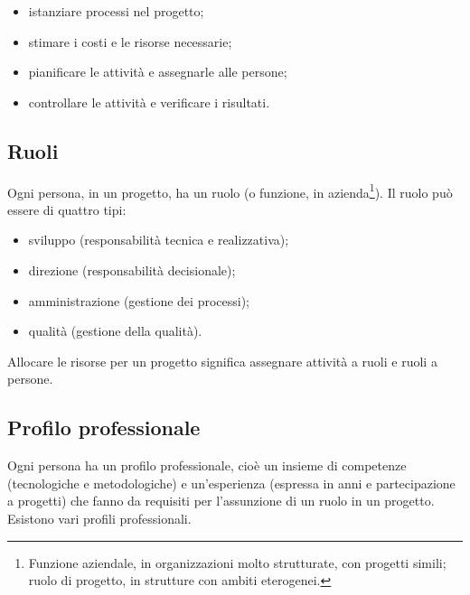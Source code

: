 \documentclass[a4paper]{article}
\begin{document}
	\begin{itemize}
		
			
	\item istanziare processi nel progetto;
			
	\item stimare i costi e le risorse necessarie;
			
	\item pianificare le attività e assegnarle alle persone;
			
	\item controllare le attività e verificare i risultati.
		
	\end{itemize}


		
	\subsection{Ruoli}

		
Ogni persona, in un progetto, ha un ruolo (o funzione, in azienda\footnote{Funzione aziendale, in organizzazioni molto strutturate, con progetti simili; ruolo di progetto, in strutture con ambiti eterogenei.}). Il ruolo può essere di quattro tipi:
		
	\begin{itemize}
		
			
	\item sviluppo (responsabilità tecnica e realizzativa);
			
	\item direzione (responsabilità decisionale);
			
	\item amministrazione (gestione dei processi);
			
	\item qualità (gestione della qualità).
		
	\end{itemize}

		
Allocare le risorse per un progetto significa assegnare attività a ruoli e ruoli a persone.

		
	\subsection{Profilo professionale}

		
Ogni persona ha un profilo professionale, cioè un insieme di competenze (tecnologiche e metodologiche) e un'esperienza (espressa in anni e partecipazione a progetti) che fanno da requisiti per l'assunzione di un ruolo in un progetto. Esistono vari profili professionali.
		
\end{document}
